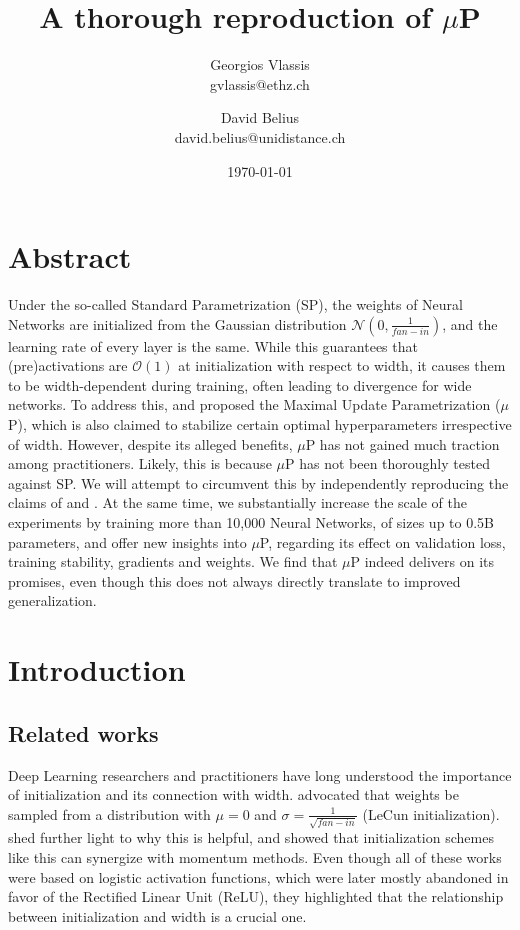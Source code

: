 \documentclass{article}
\title{A thorough reproduction of $\mu$P}
\author{
Georgios Vlassis\\
gvlassis@ethz.ch
\and
David Belius\\
david.belius@unidistance.ch
}
\date{\today}
\begin{document}
\maketitle

\section{Abstract}
Under the so-called Standard Parametrization (SP), the weights of Neural Networks are initialized from the Gaussian distribution $\mathcal{N}(0,\frac{1}{fan-in})$, and the learning rate of every layer is the same. While this guarantees that (pre)activations are $\mathcal{O}(1)$ at initialization with respect to width, it causes them to be width-dependent during training, often leading to divergence for wide networks. To address this, \cite{yang2020feature} and \cite{yang2021tuning} proposed the Maximal Update Parametrization ($\mu$P), which is also claimed to stabilize certain optimal hyperparameters irrespective of width. However, despite its alleged benefits, $\mu$P has not gained much traction among practitioners. Likely, this is because $\mu$P has not been thoroughly tested against SP. We will attempt to circumvent this by independently reproducing the claims of \cite{yang2020feature} and \cite{yang2021tuning}. At the same time, we substantially increase the scale of the experiments by training more than 10,000 Neural Networks, of sizes up to 0.5B parameters, and offer new insights into $\mu$P, regarding its effect on validation loss, training stability, gradients and weights. We find that $\mu$P indeed delivers on its promises, even though this does not always directly translate to improved generalization.

\section{Introduction}
\subsection{Related works}
Deep Learning researchers and practitioners have long understood the importance of initialization and its connection with width. \cite{lecun2002efficient} advocated that weights be sampled from a distribution with $\mu=0$ and $\sigma=\frac{1}{\sqrt{fan-in}}$ (LeCun initialization). \cite{glorot2010understanding} shed further light to why this is helpful, and \cite{sutskever2013importance} showed that initialization schemes like this can synergize with momentum methods. Even though all of these works were based on logistic activation functions, which were later mostly abandoned in favor of the Rectified Linear Unit (ReLU), they highlighted that the relationship between initialization and width is a crucial one.
\end{document}
